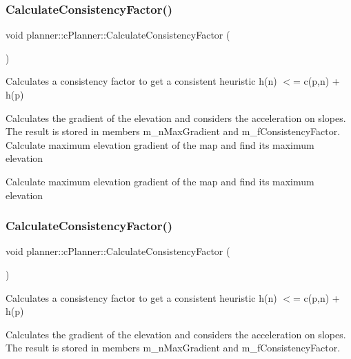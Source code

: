 \subsubsection{\texorpdfstring{Calculate\+Consistency\+Factor()}{CalculateConsistencyFactor()}\hspace{0.1cm}{\footnotesize\ttfamily [1/2]}}
{\footnotesize\ttfamily void planner\+::c\+Planner\+::\+Calculate\+Consistency\+Factor (\begin{DoxyParamCaption}{ }\end{DoxyParamCaption})\hspace{0.3cm}{\ttfamily [protected]}}



Calculates a consistency factor to get a consistent heuristic h(n) $<$= c(p,n) + h(p) 

Calculates the gradient of the elevation and considers the acceleration on slopes. The result is stored in members m\+\_\+n\+Max\+Gradient and m\+\_\+f\+Consistency\+Factor. Calculate maximum elevation gradient of the map and find its maximum elevation

Calculate maximum elevation gradient of the map and find its maximum elevation \mbox{\label{classplanner_1_1c_planner_a2e5a745f83f903662eff914d8beddb5e}} 
\subsubsection{\texorpdfstring{Calculate\+Consistency\+Factor()}{CalculateConsistencyFactor()}\hspace{0.1cm}{\footnotesize\ttfamily [2/2]}}
{\footnotesize\ttfamily void planner\+::c\+Planner\+::\+Calculate\+Consistency\+Factor (\begin{DoxyParamCaption}{ }\end{DoxyParamCaption})\hspace{0.3cm}{\ttfamily [protected]}}



Calculates a consistency factor to get a consistent heuristic h(n) $<$= c(p,n) + h(p) 

Calculates the gradient of the elevation and considers the acceleration on slopes. The result is stored in members m\+\_\+n\+Max\+Gradient and m\+\_\+f\+Consistency\+Factor. \mbox{\label{classplanner_1_1c_planner_adbffc6ce05119c940a09369d7e61554e}} 
